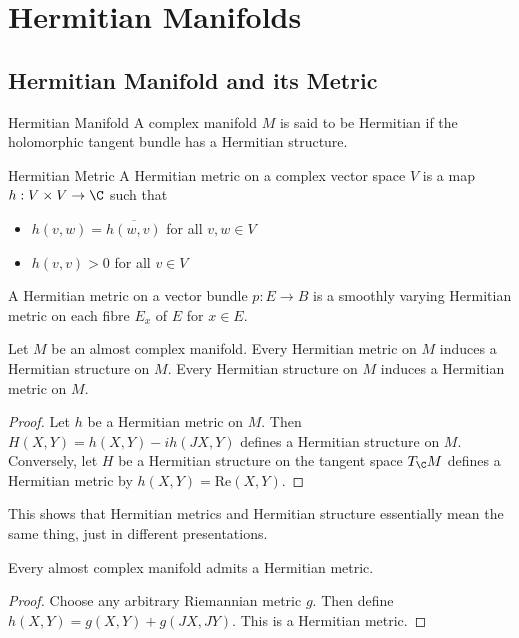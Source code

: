 \documentclass[a4paper]{article}
\begin{document}
\pagebreak
\section{Hermitian Manifolds}
\subsection{Hermitian Manifold and its Metric}
\begin{defn}{Hermitian Manifold}{} A complex manifold $M$ is said to be Hermitian if the holomorphic tangent bundle has a Hermitian structure. 
\end{defn}

\begin{defn}{Hermitian Metric}{} A Hermitian metric on a complex vector space $V$ is a map $h:V\times V\to\C$ such that 
\begin{itemize}
\item $h(v,w)=\overline{h(w,v)}$ for all $v,w\in V$
\item $h(v,v)>0$ for all $v\in V$
\end{itemize}
A Hermitian metric on a vector bundle $p:E\to B$ is a smoothly varying Hermitian metric on each fibre $E_x$ of $E$ for $x\in E$. 
\end{defn}

\begin{prp}{}{} Let $M$ be an almost complex manifold. Every Hermitian metric on $M$ induces a Hermitian structure on $M$. Every Hermitian structure on $M$ induces a Hermitian metric on $M$. \tcbline
\begin{proof}
Let $h$ be a Hermitian metric on $M$. Then $H(X,Y)=h(X,Y)-ih(JX,Y)$ defines a Hermitian structure on $M$. Conversely, let $H$ be a Hermitian structure on the tangent space $T_\C M$ defines a Hermitian metric by $h(X,Y)=\text{Re}(X,Y)$. 
\end{proof}
\end{prp}

This shows that Hermitian metrics and Hermitian structure essentially mean the same thing, just in different presentations. 

\begin{prp}{}{} Every almost complex manifold admits a Hermitian metric. \tcbline
\begin{proof}
Choose any arbitrary Riemannian metric $g$. Then define $h(X,Y)=g(X,Y)+g(JX,JY)$. This is a Hermitian metric. 
\end{proof}
\end{prp}
\end{document}
